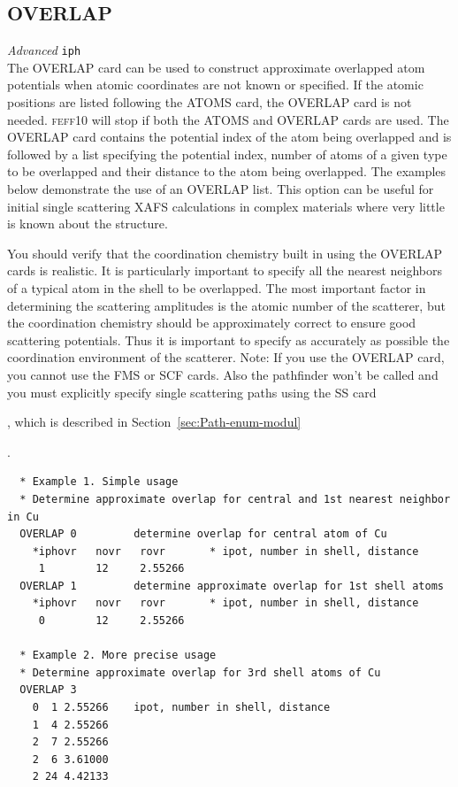 \documentclass[11pt,oneside]{report} %
\newcommand{\feffcurrent}{\textsc{feff10}}
\renewcommand{\htmlref}[2]{\hyperlink{#2}{#1}}
\newenvironment{Card}[4]%
      {\vspace{3ex}%
        \subsection{#1}
        \quad\textsl{#3}\newline
        \quad\texttt{#2}\newline%
        \label{card:#4}\\}
      {}
\renewcommand{\htmlref}[2]{{#1}} %
\begin{document}
\begin{Card}{OVERLAP}{iph}{Advanced}{ove}
  The OVERLAP card can be used to construct approximate overlapped
  atom potentials when atomic coordinates are not known or specified.
  If the atomic positions are listed following the \htmlref{ATOMS}{card:ato} 
  card, the OVERLAP card is not needed. {\feffcurrent} will stop if both 
  the ATOMS and OVERLAP cards are used. The OVERLAP card contains the 
  potential index of the atom being overlapped and is followed by a list
  specifying the potential index, number of atoms of a given type to
  be overlapped and their distance to the atom being overlapped. The
  examples below demonstrate the use of an OVERLAP list. This option
  can be useful for initial single scattering XAFS calculations in
  complex materials where very little is known about the structure.

  You should verify that the coordination chemistry built in using the
  OVERLAP cards is realistic. It is particularly important to specify
  all the nearest neighbors of a typical atom in the shell to be
  overlapped. The most important factor in determining the scattering
  amplitudes is the atomic number of the scatterer, but the coordination 
  chemistry should be approximately correct to ensure good scattering 
  potentials. Thus it is important to specify as accurately as possible 
  the coordination environment of the scatterer. Note: If you use the 
  OVERLAP card, you cannot use the \htmlref{FMS}{card:fms} or 
  \htmlref{SCF}{card:scf} cards. Also the pathfinder won't be called 
  and you must explicitly specify single scattering paths using the 
  \htmlref{SS}{card:ss} card
  \begin{latexonly}
   , which is described in Section~\ref{sec:Path-enum-modul}
  \end{latexonly}.

\begin{verbatim}
  * Example 1. Simple usage
  * Determine approximate overlap for central and 1st nearest neighbor in Cu
  OVERLAP 0         determine overlap for central atom of Cu
    *iphovr   novr   rovr       * ipot, number in shell, distance
     1        12     2.55266
  OVERLAP 1         determine approximate overlap for 1st shell atoms
    *iphovr   novr   rovr       * ipot, number in shell, distance
     0        12     2.55266

  * Example 2. More precise usage
  * Determine approximate overlap for 3rd shell atoms of Cu
  OVERLAP 3
    0  1 2.55266    ipot, number in shell, distance
    1  4 2.55266
    2  7 2.55266
    2  6 3.61000
    2 24 4.42133
\end{verbatim}
\end{Card}
\end{document}
